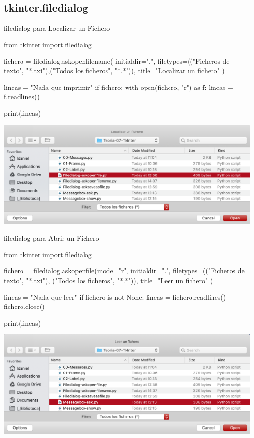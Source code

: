 \documentclass[10pt, envcountsect , spanish]{beamer}
\begin{document}
\subsection{tkinter.filedialog}


\begin{frame}[fragile]{filedialog para Localizar un  Fichero} 
\footnotesize
\begin{pyverbatim}[][frame=single]
from tkinter import filedialog

fichero = filedialog.askopenfilename(
    initialdir=".",
    filetypes=(("Ficheros de texto", "*.txt"),("Todos los ficheros", "*.*")),
    title="Localizar un fichero"
    )

lineas = "Nada que imprimir"
if fichero:
    with open(fichero, "r") as f:
        lineas = f.readlines()

print(lineas)
\end{pyverbatim}

\centerline{\includegraphics[width=.65\textwidth]{fig/askopenfilename} }

\end{frame}


\begin{frame}[fragile]{filedialog para Abrir un  Fichero} 
\footnotesize
\begin{pyverbatim}[][frame=single]
from tkinter import filedialog

fichero = filedialog.askopenfile(mode="r",
    initialdir=".",
    filetypes=(("Ficheros de texto", "*.txt"), ("Todos los ficheros", "*.*")),
    title="Leer un fichero"
)

lineas = "Nada que leer"
if fichero is not None:
    lineas = fichero.readlines()
    fichero.close()

print(lineas)

\end{pyverbatim}

\centerline{\includegraphics[width=.65\textwidth]{fig/askopenfile} }

\end{frame}
\end{document}
